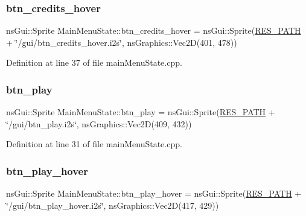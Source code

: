 \mbox{\label{class_main_menu_state_a4402cf66bc3af622d2b7c7a3e143d32a}} 
\subsubsection{\texorpdfstring{btn\+\_\+credits\+\_\+hover}{btn\_credits\_hover}}
{\footnotesize\ttfamily ns\+Gui\+::\+Sprite Main\+Menu\+State\+::btn\+\_\+credits\+\_\+hover = ns\+Gui\+::\+Sprite(\hyperlink{definitions_8h_a793644bd88146828177a2a4f57e3bf01}{R\+E\+S\+\_\+\+P\+A\+TH} + \char`\"{}/gui/btn\+\_\+credits\+\_\+hover.\+i2s\char`\"{}, ns\+Graphics\+::\+Vec2D(401, 478))}



Definition at line 37 of file main\+Menu\+State.\+cpp.

\mbox{\label{class_main_menu_state_a7de6cb44676e4d79205a1554dc93af5c}} 
\subsubsection{\texorpdfstring{btn\+\_\+play}{btn\_play}}
{\footnotesize\ttfamily ns\+Gui\+::\+Sprite Main\+Menu\+State\+::btn\+\_\+play = ns\+Gui\+::\+Sprite(\hyperlink{definitions_8h_a793644bd88146828177a2a4f57e3bf01}{R\+E\+S\+\_\+\+P\+A\+TH} + \char`\"{}/gui/btn\+\_\+play.\+i2s\char`\"{}, ns\+Graphics\+::\+Vec2D(409, 432))}



Definition at line 31 of file main\+Menu\+State.\+cpp.

\mbox{\label{class_main_menu_state_aade833b5a15f6bddd7d72e9f641a96ea}} 
\subsubsection{\texorpdfstring{btn\+\_\+play\+\_\+hover}{btn\_play\_hover}}
{\footnotesize\ttfamily ns\+Gui\+::\+Sprite Main\+Menu\+State\+::btn\+\_\+play\+\_\+hover = ns\+Gui\+::\+Sprite(\hyperlink{definitions_8h_a793644bd88146828177a2a4f57e3bf01}{R\+E\+S\+\_\+\+P\+A\+TH} + \char`\"{}/gui/btn\+\_\+play\+\_\+hover.\+i2s\char`\"{}, ns\+Graphics\+::\+Vec2D(417, 429))}



